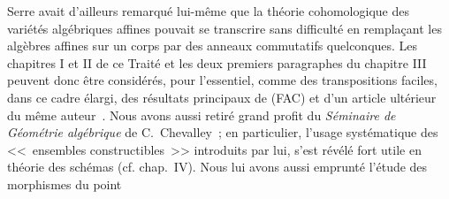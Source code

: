 Serre avait d'ailleurs remarqué lui-même que la théorie cohomologique des variétés algébriques affines pouvait se transcrire sans difficulté en remplaçant les algèbres affines sur un corps par des anneaux commutatifs quelconques.
Les chapitres I et II de ce Traité et les deux premiers paragraphes du chapitre III peuvent donc être considérés, pour l'essentiel, comme des transpositions faciles, dans ce cadre élargi, des résultats principaux de (FAC) et d'un article ultérieur du même auteur~\cite{I-15}.
Nous avons aussi retiré grand profit du \emph{Séminaire de Géométrie algébrique} de C.~Chevalley~\cite{I-1}; en particulier, l'usage systématique des <<~ensembles constructibles~>> introduits par lui, s'est révélé fort utile en théorie des schémas (cf. chap.~IV).
Nous lui avons aussi emprunté l'étude des morphismes du point

